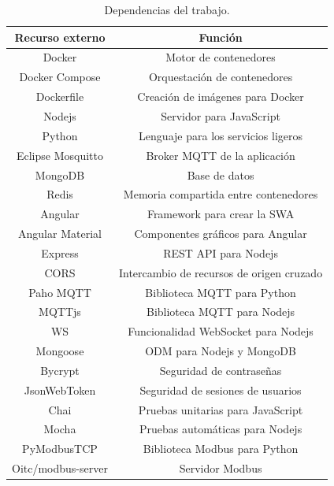 \begin{table}[h]
	\centering
	\caption{\label{tab:dependencias}Dependencias del trabajo.}
	\begin{tabular}{c c}
		\toprule
		\textbf{Recurso externo}      & \textbf{Función}                          \\
		\midrule
		Docker             & Motor de contenedores                     \\
		Docker Compose     & Orquestación de contenedores              \\
		Dockerfile         & Creación de imágenes para Docker          \\
		Nodejs             & Servidor para JavaScript                  \\
		Python             & Lenguaje para los servicios ligeros       \\
		Eclipse Mosquitto  & Broker MQTT de la aplicación              \\
		MongoDB            & Base de datos                             \\
		Redis              & Memoria compartida entre contenedores     \\
		Angular            & Framework para crear la SWA               \\
		Angular Material   & Componentes gráficos para Angular         \\
		Express            & REST API para Nodejs                      \\
		CORS               & Intercambio de recursos de origen cruzado \\
		Paho MQTT          & Biblioteca MQTT para Python               \\
		MQTTjs             & Biblioteca MQTT para Nodejs               \\
		WS                 & Funcionalidad WebSocket para Nodejs       \\
		Mongoose           & ODM para Nodejs y MongoDB                 \\
		Bycrypt            & Seguridad de contraseñas                  \\
		JsonWebToken       & Seguridad de sesiones de usuarios         \\
		Chai               & Pruebas unitarias para JavaScript         \\
		Mocha              & Pruebas automáticas para Nodejs           \\
		PyModbusTCP        & Biblioteca Modbus para Python             \\
		Oitc/modbus-server & Servidor Modbus                           \\
		\bottomrule
		\hline
	\end{tabular}
\end{table}